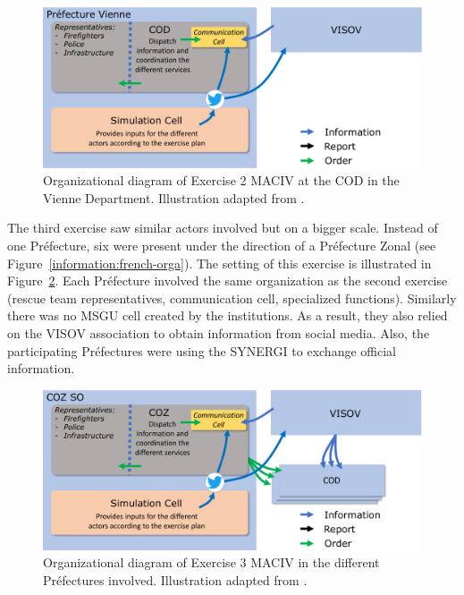 \begin{figure}[htb]
    \centering
    \includegraphics[width=\textwidth]{figures/chap-3/exercice-2-setup.pdf}
    \caption{Organizational diagram of Exercise 2 MACIV at the COD in the Vienne Department. Illustration adapted from \textcite{batardIntegrerContributionsCitoyennes2021}.}
    \label{information:exercice-2-setup}
\end{figure}

The third exercise saw similar actors involved but on a bigger scale.
Instead of one Préfecture, six were present under the direction of a Préfecture Zonal (see Figure~\ref{information:french-orga}).
The setting of this exercise is illustrated in Figure~\ref{information:exercice-3-setup}.
Each Préfecture involved the same organization as the second exercise (rescue team representatives, communication cell, specialized functions).
Similarly there was no MSGU cell created by the institutions.
As a result, they also relied on the VISOV association to obtain information from social media.
Also, the participating Préfectures were using the SYNERGI to exchange official information.

\begin{figure}[htb]
    \centering
    \includegraphics[width=\textwidth]{figures/chap-3/exercice-3-setup.pdf}
    \caption{Organizational diagram of Exercise 3 MACIV in the different Préfectures involved. Illustration adapted from \textcite{batardIntegrerContributionsCitoyennes2021}.}
    \label{information:exercice-3-setup}
\end{figure}


